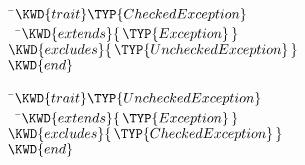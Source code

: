 
\begin{Fortress}
{\tt~}\pushtabs\=\+\( \KWD{trait} \TYP{CheckedException} \)\\
{\tt~~}\pushtabs\=\+\(   \KWD{extends} \{\,\TYP{Exception}\,\}\)\\
\(   \KWD{excludes} \{\,\TYP{UncheckedException}\,\}\)\-\\\poptabs
\( \KWD{end}\)\-\\\poptabs
\end{Fortress}


\begin{Fortress}
{\tt~}\pushtabs\=\+\( \KWD{trait} \TYP{UncheckedException} \)\\
{\tt~~}\pushtabs\=\+\(   \KWD{extends} \{\,\TYP{Exception}\,\}\)\\
\(   \KWD{excludes} \{\,\TYP{CheckedException}\,\}\)\-\-\\\poptabs\poptabs
\(\KWD{end}\)
\end{Fortress}
